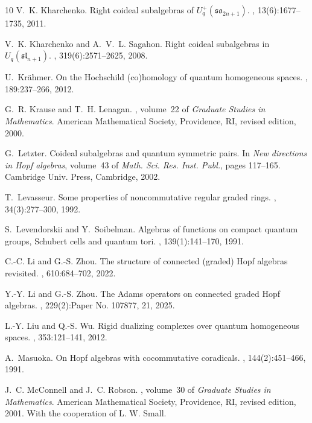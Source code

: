 \documentclass{article}
\theoremstyle{plain}
\theoremstyle{definition}
\numberwithin{equation}{section}
\newcommand{\germ}{\mathfrak}
\begin{document}
\begin{thebibliography}{10}
V.~K. Kharchenko.
\newblock Right coideal subalgebras of {$U^+_q({\germ{so}}_{2n+1})$}.
, 13(6):1677--1735, 2011.

V.~K. Kharchenko and A.~V.~L. Sagahon.
\newblock Right coideal subalgebras in {$U_q(\germ {sl}_{n+1})$}.
, 319(6):2571--2625, 2008.

U.~Kr\"ahmer.
\newblock On the {H}ochschild (co)homology of quantum homogeneous spaces.
, 189:237--266, 2012.

G.~R. Krause and T.~H. Lenagan.
,
  volume~22 of {\em Graduate Studies in Mathematics}.
\newblock American Mathematical Society, Providence, RI, revised edition, 2000.

G.~Letzter.
\newblock Coideal subalgebras and quantum symmetric pairs.
\newblock In {\em New directions in {H}opf algebras}, volume~43 of {\em Math.
  Sci. Res. Inst. Publ.}, pages 117--165. Cambridge Univ. Press, Cambridge,
  2002.

T.~Levasseur.
\newblock Some properties of noncommutative regular graded rings.
, 34(3):277--300, 1992.

S.~Levendorskii and Y.~Soibelman.
\newblock Algebras of functions on compact quantum groups, {S}chubert cells and
  quantum tori.
, 139(1):141--170, 1991.

C.-C. Li and G.-S. Zhou.
\newblock The structure of connected (graded) {H}opf algebras revisited.
, 610:684--702, 2022.

Y.-Y. Li and G.-S. Zhou.
\newblock The {A}dams operators on connected graded {H}opf algebras.
, 229(2):Paper No. 107877, 21, 2025.

L.-Y. Liu and Q.-S. Wu.
\newblock Rigid dualizing complexes over quantum homogeneous spaces.
, 353:121--141, 2012.

A.~Masuoka.
\newblock On {H}opf algebras with cocommutative coradicals.
, 144(2):451--466, 1991.

J.~C. McConnell and J.~C. Robson.
, volume~30 of {\em Graduate
  Studies in Mathematics}.
\newblock American Mathematical Society, Providence, RI, revised edition, 2001.
\newblock With the cooperation of L. W. Small.


\end{thebibliography}
\end{document}
